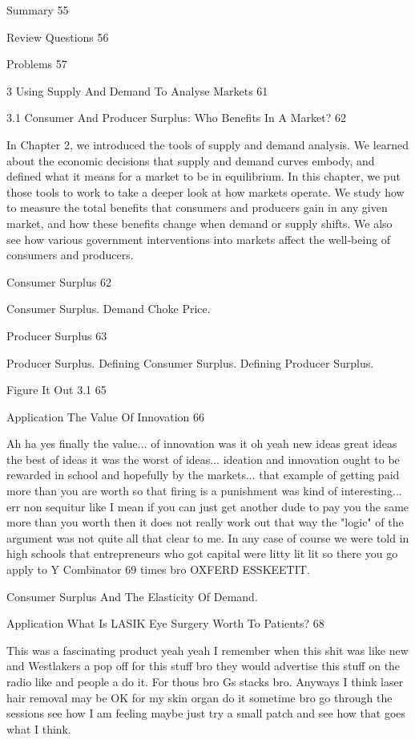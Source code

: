 Summary 55



Review Questions 56



Problems 57



3 Using Supply And Demand To Analyse Markets 61



3.1 Consumer And Producer Surplus: Who Benefits In A Market? 62

In Chapter 2, we introduced the tools of supply and demand analysis. We learned about the economic decisions that supply and demand curves embody, and defined what it means for a market to be in equilibrium. In this chapter, we put those tools to work to take a deeper look at how markets operate. We study how to measure the total benefits that consumers and producers gain in any given market, and how these benefits change when demand or supply shifts. We also see how various government interventions into markets affect the well-being of consumers and producers.

Consumer Surplus 62

Consumer Surplus. Demand Choke Price.

Producer Surplus 63

Producer Surplus. Defining Consumer Surplus. Defining Producer Surplus.

Figure It Out 3.1 65



Application The Value Of Innovation 66

Ah ha yes finally the value... of innovation was it oh yeah new ideas great ideas the best of ideas it was the worst of ideas... ideation and innovation ought to be rewarded in school and hopefully by the markets... that example of getting paid more than you are worth so that firing is a punishment was kind of interesting... err non sequitur like I mean if you can just get another dude to pay you the same more than you worth then it does not really work out that way the "logic" of the argument was not quite all that clear to me. In any case of course we were told in high schools that entrepreneurs who got capital were litty lit lit so there you go apply to Y Combinator 69 times bro OXFERD ESSKEETIT.

Consumer Surplus And The Elasticity Of Demand.

Application What Is LASIK Eye Surgery Worth To Patients? 68

This was a fascinating product yeah yeah I remember when this shit was like new and Westlakers a pop off for this stuff bro they would advertise this stuff on the radio like and people a do it. For thous bro Gs stacks bro. Anyways I think laser hair removal may be OK for my skin organ do it sometime bro go through the sessions see how I am feeling maybe just try a small patch and see how that goes what I think.


